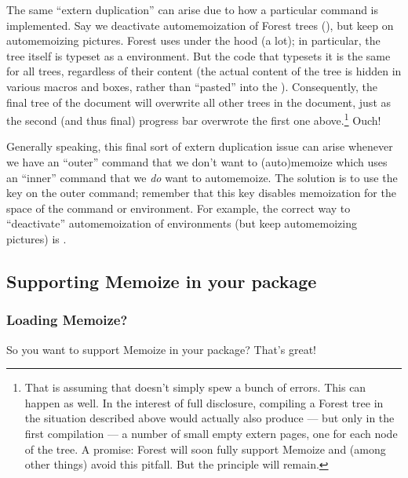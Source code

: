 \documentclass[a4paper,11pt]{article}
\begin{document}
The same ``extern duplication'' can arise due to how a particular command is
implemented.  Say we deactivate automemoization of Forest trees
(), but keep on automemoizing \TikZ pictures.
Forest uses  under the hood (a
lot); in particular, the tree itself is typeset as a 
environment.  But the code that typesets it is the same for all trees,
regardless of their content (the actual content of the tree is hidden in
various macros and boxes, rather than ``pasted'' into the ).
Consequently, the final tree of the document will overwrite all other trees in
the document, just as the second (and thus final) progress bar overwrote the
first one above.\footnote{That is assuming that  doesn't simply
  spew a bunch of errors. This can happen as well.  In the interest of full
  disclosure, compiling a Forest tree in the situation described above would
  actually also produce --- but only in the first compilation --- a number of
  small empty extern pages, one for each node of the tree.  A promise: Forest
  will soon fully support Memoize and (among other things) avoid this pitfall.
  But the principle will remain.}  Ouch!

Generally speaking, this final sort of extern duplication issue can arise
whenever we have an ``outer'' command that we don't want to (auto)memoize which
uses an ``inner'' command that we \emph{do} want to automemoize.  The solution
is to use the  key  on the outer command;
remember that this key disables memoization for the space of the command or
environment.  For example, the correct way to ``deactivate'' automemoization of
 environments (but keep automemoizing \TikZ pictures) is
.




\subsection{Supporting Memoize in your package}
\label{sec:tut:package}

\subsubsection{Loading Memoize?}
\label{sec:loading-memoize}

So you want to support Memoize in your package? That's great!
\end{document}
